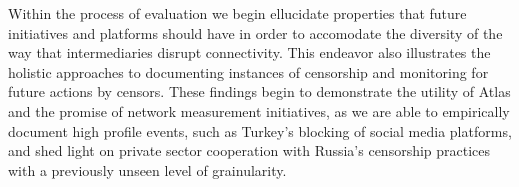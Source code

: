 Within the process of evaluation we begin ellucidate properties that future initiatives and platforms should have in order to accomodate the diversity of the way that intermediaries disrupt connectivity. This endeavor also illustrates the holistic approaches to documenting instances of censorship and monitoring for future actions by censors. These findings begin to demonstrate the utility of Atlas and the promise of network measurement initiatives, as we are able to empirically document high profile events, such as Turkey's blocking of social media platforms, and shed light on private sector cooperation with Russia's censorship practices with a previously unseen level of grainularity.   